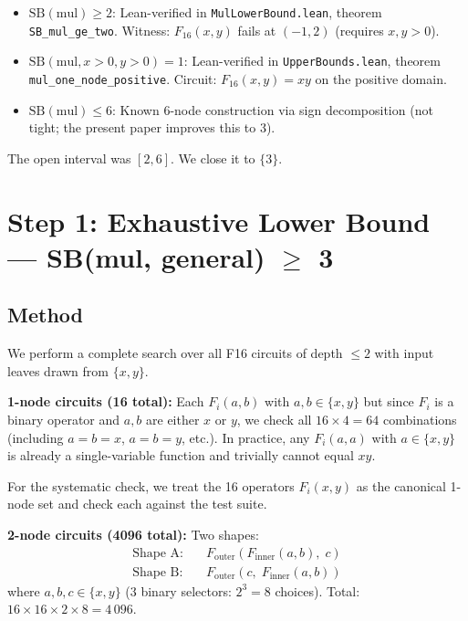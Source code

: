 \documentclass[12pt]{article}
\theoremstyle{definition}
\begin{document}
\begin{itemize}
  \item $\mathrm{SB}(\mathrm{mul}) \geq 2$: Lean-verified in
    \texttt{MulLowerBound.lean}, theorem \texttt{SB\_mul\_ge\_two}.
    Witness: $F_{16}(x, y)$ fails at $(-1, 2)$ (requires $x, y > 0$).

  \item $\mathrm{SB}(\mathrm{mul}, x{>}0, y{>}0) = 1$: Lean-verified in
    \texttt{UpperBounds.lean}, theorem \texttt{mul\_one\_node\_positive}.
    Circuit: $F_{16}(x, y) = xy$ on the positive domain.

  \item $\mathrm{SB}(\mathrm{mul}) \leq 6$: Known 6-node construction via
    sign decomposition (not tight; the present paper improves this to 3).
\end{itemize}

The open interval was $[2, 6]$.  We close it to $\{3\}$.

\section{Step 1: Exhaustive Lower Bound — SB(mul, general) $\geq$ 3}

\subsection{Method}

We perform a complete search over all F16 circuits of depth $\leq 2$ with
input leaves drawn from $\{x, y\}$.

\textbf{1-node circuits (16 total):}  Each $F_i(a, b)$ with $a, b \in \{x, y\}$
but since $F_i$ is a binary operator and $a, b$ are either $x$ or $y$, we check
all $16 \times 4 = 64$ combinations (including $a=b=x$, $a=b=y$, etc.).
In practice, any $F_i(a, a)$ with $a \in \{x, y\}$ is already a
single-variable function and trivially cannot equal $xy$.

For the systematic check, we treat the 16 operators $F_i(x, y)$ as the
canonical 1-node set and check each against the test suite.

\textbf{2-node circuits (4096 total):}  Two shapes:
\begin{align*}
  \text{Shape A:} &\quad F_{\mathrm{outer}}(F_{\mathrm{inner}}(a, b),\; c) \\
  \text{Shape B:} &\quad F_{\mathrm{outer}}(c,\; F_{\mathrm{inner}}(a, b))
\end{align*}
where $a, b, c \in \{x, y\}$ (3 binary selectors: $2^3 = 8$ choices).
Total: $16 \times 16 \times 2 \times 8 = 4\,096$.
\end{document}
